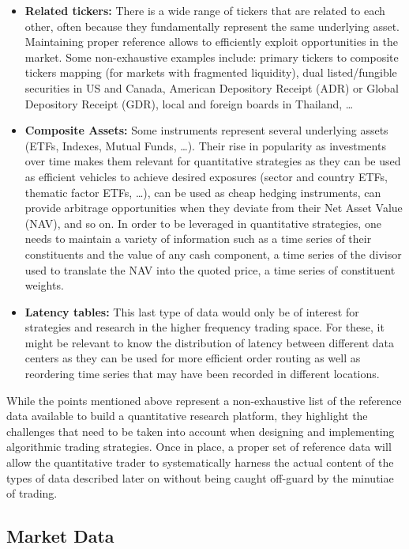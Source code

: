\begin{itemize}
\item \textbf{Related tickers:} There is a wide range of tickers that are related to each other, often because they fundamentally represent the same underlying asset. Maintaining proper reference allows to efficiently exploit opportunities in the market. Some non-exhaustive examples include: primary tickers to composite tickers mapping (for markets with fragmented liquidity), dual listed/fungible securities in US and Canada, American Depository Receipt (ADR) or Global Depository Receipt (GDR), local and foreign boards in Thailand, \dots 


\item \textbf{Composite Assets:} Some instruments represent several underlying assets (ETFs, Indexes, Mutual Funds, \dots). Their rise in popularity as investments over time makes them relevant for quantitative strategies as they can be used as efficient vehicles to achieve desired exposures (sector and country ETFs, thematic factor ETFs, \dots), can be used as cheap hedging instruments, can provide arbitrage opportunities when they deviate from their Net Asset Value (NAV), and so on. 
In order to be leveraged in quantitative strategies, one needs to maintain a variety of information such as a time series of their constituents and the value of any cash component, a time series of the divisor used to translate the NAV into the quoted price, a time series of constituent weights. 


\item \textbf{Latency tables:} This last type of data would only be of interest for strategies and research in the higher frequency trading space. For these, it might be relevant to know the distribution of latency between different data centers as they can be used for more efficient order routing as well as reordering time series that may have been recorded in different locations.
\end{itemize}


While the points mentioned above represent a non-exhaustive list of the reference data available to build a quantitative research platform, they highlight the challenges that need to be taken into account when designing and implementing algorithmic trading strategies. Once in place, a proper set of reference data will allow the quantitative trader to systematically harness the actual content of the types of data described later on without being caught off-guard by the minutiae of trading.


\subsection{Market Data \label{subsec:marketdata} }

